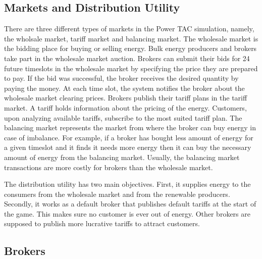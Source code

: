 \subsection{Markets and Distribution Utility}

There are three different types of markets in the Power TAC simulation, namely, the wholsale market, tariff market and balancing market. The wholesale market is the bidding place for buying or selling energy. Bulk energy producers and brokers take part in the wholesale market auction. Brokers can submit their bids for 24 future timeslots in the wholesale market by specifying the price they are prepared to pay. If the bid was successful, the broker receives the desired quantity by paying the money. At each time slot, the system notifies the broker about the wholesale market clearing prices. Brokers publish their tariff plans in the tariff market. A tariff holds information about the pricing of the energy. Customers, upon analyzing available tariffs, subscribe to the most suited tariff plan. The balancing market represents the market from where the broker can buy energy in case of imbalance. For example, if a broker has bought less amount of energy for a given timeslot and it finds it needs more energy then it can buy the necessary amount of energy from the balancing market. Usually, the balancing market transactions are more costly for brokers than the wholesale market.

The distribution utility has two main objectives. First, it supplies energy to the consumers from the wholesale market and from the renewable producers. Secondly, it works as a default broker that publishes default tariffs at the start of the game. This makes sure no customer is ever out of energy. Other brokers are supposed to publish more lucrative tariffs to attract customers.

\subsection{Brokers}

